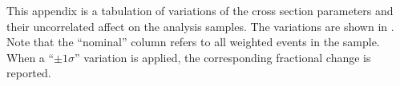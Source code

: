 This appendix is a tabulation of variations of the cross section parameters
and their uncorrelated affect on the analysis samples. The variations
are shown in . Note that the ``nominal'' column
refers to all weighted events in the sample. When a ``$\pm1\sigma$''
variation is applied, the corresponding fractional change is reported. 

\begin{landscape}



\end{landscape}
